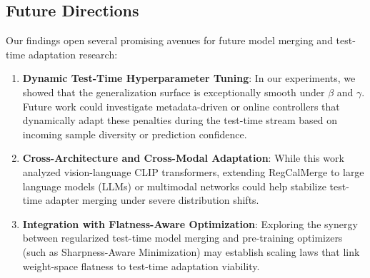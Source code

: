 \subsection{Future Directions}
Our findings open several promising avenues for future model merging and test-time adaptation research:
\begin{enumerate}
    \item \textbf{Dynamic Test-Time Hyperparameter Tuning}: In our experiments, we showed that the generalization surface is exceptionally smooth under $\beta$ and $\gamma$. Future work could investigate metadata-driven or online controllers that dynamically adapt these penalties during the test-time stream based on incoming sample diversity or prediction confidence.
    \item \textbf{Cross-Architecture and Cross-Modal Adaptation}: While this work analyzed vision-language CLIP transformers, extending RegCalMerge to large language models (LLMs) or multimodal networks could help stabilize test-time adapter merging under severe distribution shifts.
    \item \textbf{Integration with Flatness-Aware Optimization}: Exploring the synergy between regularized test-time model merging and pre-training optimizers (such as Sharpness-Aware Minimization) may establish scaling laws that link weight-space flatness to test-time adaptation viability.
\end{enumerate}